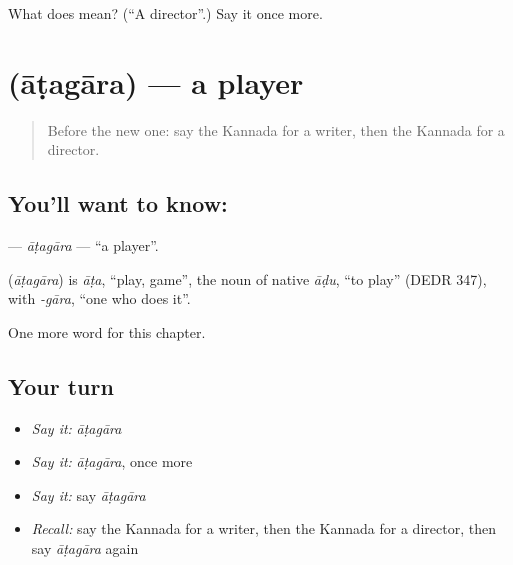 \begin{tcolorbox}[breakable,colback=teal!4,colframe=teal!35!black,title={Before you move on}]
What does  mean? (\textquotedblleft{}A director\textquotedblright{}.) Say it once more.
\end{tcolorbox}
\section[\texorpdfstring{\kn{ಆಟಗಾರ} (āṭagāra)}{ಆಟಗಾರ (āṭagāra)}]{ (āṭagāra) — a player}

\label{lesson:KA-C196-atagara}



\begin{quote}
Before the new one: say the Kannada for a writer, then the Kannada for a director.
\end{quote}

\subsection*{You'll want to know: }
\textbf{} — \emph{āṭagāra} — \textquotedblleft{}a player\textquotedblright{}.

\begin{cousinweb}
\textbf{} (\emph{āṭagāra}) is \emph{āṭa}, \textquotedblleft{}play, game\textquotedblright{}, the noun of native \emph{āḍu}, \textquotedblleft{}to play\textquotedblright{} (DEDR 347), with \emph{-gāra}, \textquotedblleft{}one who does it\textquotedblright{}.
\end{cousinweb}

\begin{grammarlens}[title={What you've built}]
One more word for this chapter.
\end{grammarlens}

\subsection*{Your turn}
\begin{itemize}
\raggedright
  \item \emph{Say it:} \emph{āṭagāra}
  \item \emph{Say it:} \emph{āṭagāra}, once more
  \item \emph{Say it:} say \emph{āṭagāra}
  \item \emph{Recall:} say the Kannada for a writer, then the Kannada for a director, then say \emph{āṭagāra} again
\end{itemize}

